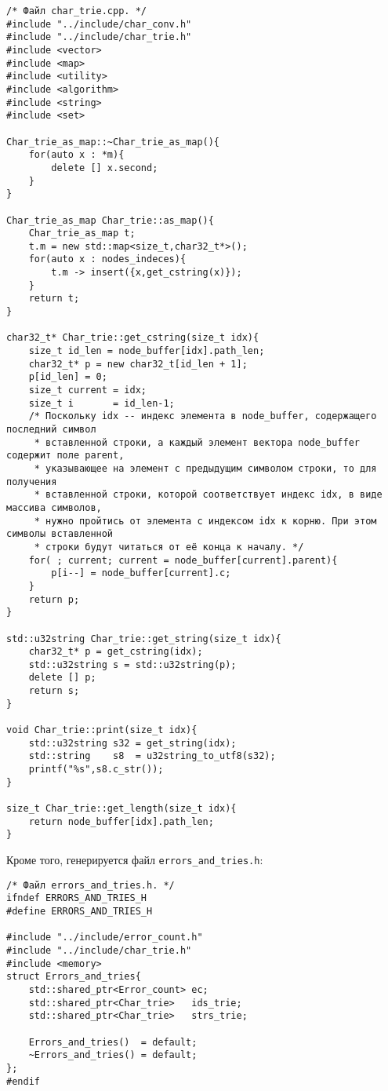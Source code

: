 \documentclass[10pt]{report}
\newcounter{defin}[section]
\newcounter{algor}[section]
\begin{document}
\begin{verbatim}
/* Файл char_trie.cpp. */
#include "../include/char_conv.h"
#include "../include/char_trie.h"
#include <vector>
#include <map>
#include <utility>
#include <algorithm>
#include <string>
#include <set>

Char_trie_as_map::~Char_trie_as_map(){
    for(auto x : *m){
        delete [] x.second;
    }
}

Char_trie_as_map Char_trie::as_map(){
    Char_trie_as_map t;
    t.m = new std::map<size_t,char32_t*>();
    for(auto x : nodes_indeces){
        t.m -> insert({x,get_cstring(x)});
    }
    return t;
}

char32_t* Char_trie::get_cstring(size_t idx){
    size_t id_len = node_buffer[idx].path_len;
    char32_t* p = new char32_t[id_len + 1];
    p[id_len] = 0;
    size_t current = idx;
    size_t i       = id_len-1;
    /* Поскольку idx -- индекс элемента в node_buffer, содержащего последний символ
     * вставленной строки, а каждый элемент вектора node_buffer содержит поле parent,
     * указывающее на элемент с предыдущим символом строки, то для получения
     * вставленной строки, которой соответствует индекс idx, в виде массива символов,
     * нужно пройтись от элемента с индексом idx к корню. При этом символы вставленной
     * строки будут читаться от её конца к началу. */
    for( ; current; current = node_buffer[current].parent){
        p[i--] = node_buffer[current].c;
    }
    return p;
}

std::u32string Char_trie::get_string(size_t idx){
    char32_t* p = get_cstring(idx);
    std::u32string s = std::u32string(p);
    delete [] p;
    return s;
}

void Char_trie::print(size_t idx){
    std::u32string s32 = get_string(idx);
    std::string    s8  = u32string_to_utf8(s32);
    printf("%s",s8.c_str());
}

size_t Char_trie::get_length(size_t idx){
    return node_buffer[idx].path_len;
}
\end{verbatim}

Кроме того, генерируется файл \texttt{errors_and_tries.h}:
\begin{verbatim}
/* Файл errors_and_tries.h. */
ifndef ERRORS_AND_TRIES_H
#define ERRORS_AND_TRIES_H

#include "../include/error_count.h"
#include "../include/char_trie.h"
#include <memory>
struct Errors_and_tries{
    std::shared_ptr<Error_count> ec;
    std::shared_ptr<Char_trie>   ids_trie;
    std::shared_ptr<Char_trie>   strs_trie;

    Errors_and_tries()  = default;
    ~Errors_and_tries() = default;
};
#endif
\end{verbatim}
\end{document}
